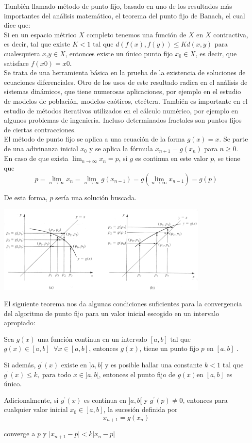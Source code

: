 También llamado método de punto fijo, basado en uno de los resultados más importantes
del análisis matemático, el teorema del punto fijo de Banach, el cual dice
que:
\\
    Si en un espacio métrico $X$ completo tenemos una función de $X$ en $X$
contractiva, es decir, tal que existe $K<1$ tal que $d(f(x),f(y)) \leq
Kd(x,y)$
para cualesquiera $x$,$y\in X$, entonces existe un único punto fijo $x_0\in X$, es
decir, que satisface $f(x0) = x0$.
\\

Se trata de una herramienta básica en la prueba de la existencia de soluciones
de ecuaciones diferenciales. Otro de los usos de este resultado radica en el
análisis de sistemas dinámicos, que tiene numerosas aplicaciones, por ejemplo
en el estudio de modelos de población, modelos caóticos, etcétera. También es
importante en el estudio de métodos iterativos utilizados en el cálculo
numérico, por ejemplo en algunos problemas de ingeniería. Incluso determinados
fractales son puntos fijos de ciertas contracciones.\\

El método de punto fijo se aplica a una ecuación de la forma $g(x) =x$. Se
parte de una adivinanza inicial $x_0$ y se aplica la fórmula $x_{n+1}= g(x_n)$
para $n\geq 0$. En caso de que exista $\lim_{n \to \infty } x_n = p$, si $g$
es continua en este valor $p$, se tiene que
\begin{displaymath}p=\lim_{n \to \infty } x_n = \lim_{n \to \infty }
g(x_{n-1}) = g(\lim_{n \to \infty } x_{n-1} ) = g(p) \end{displaymath}


De esta forma, $p$ sería una solución buscada. 

\includegraphics[width=400px]{img/PuntoFijo}

El siguiente teorema nos da algunas condiciones suficientes para
la convergencia del algoritmo de punto fijo para un valor inicial escogido en
un intervalo apropiado:

Sea $g(x)$ una función continua en un intervalo $[a, b]$ tal que
$g(x) \in [a,b] \; \; \forall x \in [a,b]$, entonces $g(x)$, tiene un punto
fijo $p$ en $[a, b]$ .

Si además, $g^\prime (x) $ existe en $]a,b[$ y es posible hallar una constante
$k<1$ tal que $g^\prime (x) \leq k, \; \mbox{para todo } x \in ]a,b[$,
entonces el punto fijo de $g(x)$en $[a, b]$ es único.

Adicionalmente, si $g^\prime (x) $ es continua en $]a,b[$ y $g^\prime (p) \neq
0$, entonces para cualquier valor inicial $x_0 \in [a, b]$, la sucesión
definida por
\begin{displaymath}x_{n+1}=g(x_n)\end{displaymath}
 
converge a $p$ y $\vert x_{n+1}-p\vert<k\vert x_n-p\vert$
